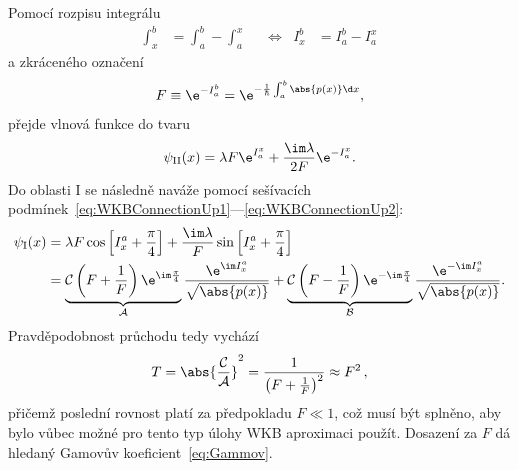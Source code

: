 \begin{solution}
\begin{enumerate}
		Pomocí rozpisu integrálu
		\begin{align}
			\int_{x}^{b}&=\int_{a}^{b}-\int_{a}^{x} && \Longleftrightarrow & I_{x}^{b}&=I_{a}^{b}-I_{a}^{x}
		\end{align}
		a zkráceného označení
		\begin{equation}
			F\equiv\e^{-I_{a}^{b}}=\e^{-\frac{1}{\hbar}\int_{a}^{b}\abs{p(x)}\d x},
		\end{equation}
		přejde vlnová funkce do tvaru
		\begin{equation}
			\psi_{\mathrm{II}}(x)=\lambda F\e^{I_{a}^{x}}+\frac{\im\lambda}{2F}\e^{-I_{a}^{x}}.
		\end{equation}
		Do oblasti I se následně naváže pomocí sešívacích podmínek~\eqref{eq:WKBConnectionUp1}---\eqref{eq:WKBConnectionUp2}:
		\begin{align}
			\psi_{\mathrm{I}}(x)
				&=\lambda F\cos\left[I_{x}^{a}+\frac{\pi}{4}\right]+\frac{\im\lambda}{F}\sin\left[I_{x}^{a}+\frac{\pi}{4}\right]\nonumber\\										
				&=\underbrace{\mathcal{C}\left(F+\frac{1}{F}\right)\e^{\im\frac{\pi}{4}}}_{\mathcal{A}}\frac{\e^{\im I_{x}^{a}}}{\sqrt{\abs{p(x)}}}
					+\underbrace{\mathcal{C}\left(F-\frac{1}{F}\right)\e^{-\im\frac{\pi}{4}}}_{\mathcal{B}}\frac{\e^{-\im I_{x}^{a}}}{\sqrt{\abs{p(x)}}}.
		\end{align}
		Pravděpodobnost průchodu tedy vychází
		\begin{equation}
			T=\abs{\frac{\mathcal{C}}{\mathcal{A}}}^{2}=\frac{1}{\left(F+\frac{1}{F}\right)^{2}}\approx F^{2}\,,
		\end{equation}
		přičemž poslední rovnost platí za předpokladu $F\ll1$, což musí být splněno, aby bylo vůbec možné pro tento typ úlohy WKB aproximaci použít.
		Dosazení za $F$ dá hledaný Gamovův koeficient~\eqref{eq:Gammov}.
		

\end{enumerate}
\end{solution}

